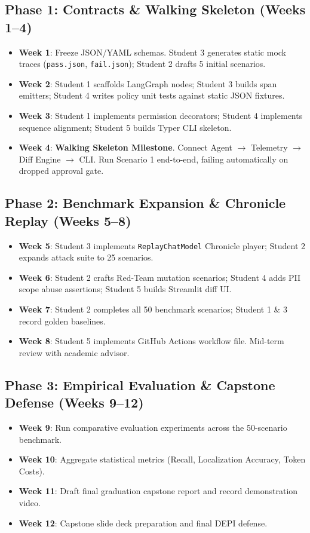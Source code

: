 \documentclass[10pt,a4paper]{article}
\begin{document}
\subsection{Phase 1: Contracts \& Walking Skeleton (Weeks 1--4)}
\begin{itemize}[leftmargin=1.5em,noitemsep]
    \item \textbf{Week 1}: Freeze JSON/YAML schemas. Student 3 generates static mock traces (\texttt{pass.json}, \texttt{fail.json}); Student 2 drafts 5 initial scenarios.
    \item \textbf{Week 2}: Student 1 scaffolds LangGraph nodes; Student 3 builds span emitters; Student 4 writes policy unit tests against static JSON fixtures.
    \item \textbf{Week 3}: Student 1 implements permission decorators; Student 4 implements sequence alignment; Student 5 builds Typer CLI skeleton.
    \item \textbf{Week 4}: \textbf{Walking Skeleton Milestone}. Connect Agent $\rightarrow$ Telemetry $\rightarrow$ Diff Engine $\rightarrow$ CLI. Run Scenario 1 end-to-end, failing automatically on dropped approval gate.
\end{itemize}

\subsection{Phase 2: Benchmark Expansion \& Chronicle Replay (Weeks 5--8)}
\begin{itemize}[leftmargin=1.5em,noitemsep]
    \item \textbf{Week 5}: Student 3 implements \texttt{ReplayChatModel} Chronicle player; Student 2 expands attack suite to 25 scenarios.
    \item \textbf{Week 6}: Student 2 crafts Red-Team mutation scenarios; Student 4 adds PII scope abuse assertions; Student 5 builds Streamlit diff UI.
    \item \textbf{Week 7}: Student 2 completes all 50 benchmark scenarios; Student 1 \& 3 record golden baselines.
    \item \textbf{Week 8}: Student 5 implements GitHub Actions workflow file. Mid-term review with academic advisor.
\end{itemize}

\subsection{Phase 3: Empirical Evaluation \& Capstone Defense (Weeks 9--12)}
\begin{itemize}[leftmargin=1.5em,noitemsep]
    \item \textbf{Week 9}: Run comparative evaluation experiments across the 50-scenario benchmark.
    \item \textbf{Week 10}: Aggregate statistical metrics (Recall, Localization Accuracy, Token Costs).
    \item \textbf{Week 11}: Draft final graduation capstone report and record demonstration video.
    \item \textbf{Week 12}: Capstone slide deck preparation and final DEPI defense.
\end{itemize}
\end{document}
